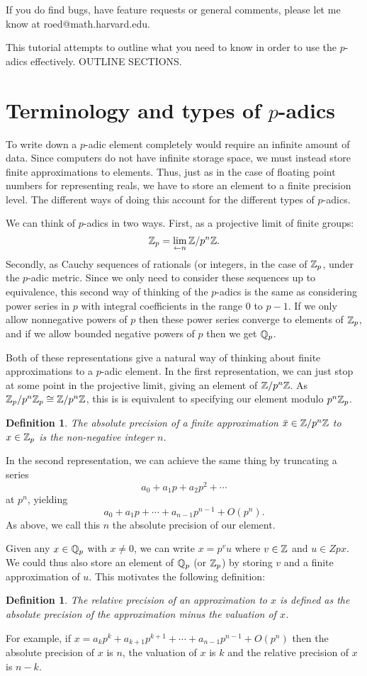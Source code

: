 \documentclass[12pt]{article}
\newtheorem{definition}[theorem]{Definition}
\begin{document}
If you do find bugs, have feature requests or general comments, please let me know
at roed@math.harvard.edu.

This tutorial attempts to outline what you need to know in order to use
the $p$-adics effectively.  OUTLINE SECTIONS.

\section{Terminology and types of $p$-adics}

To write down a $p$-adic element completely would require an infinite amount of data.
Since computers do not have infinite storage space, we must instead store finite
approximations to elements.  Thus, just as in the case of floating point numbers for
representing reals, we have to store an element to a finite precision level.
The different ways of doing this account for the different types of $p$-adics.

We can think of $p$-adics in two ways.  First, as a projective limit of finite groups:
$$\mathbb{Z}_p = \lim_{\leftarrow n} \mathbb{Z} / p^n\mathbb{Z}.$$
Secondly, as Cauchy sequences of rationals (or integers, in the case of $\mathbb{Z}_p$, under the
$p$-adic metric.  Since we only need to consider these sequences up to equivalence, this
second way of thinking of the $p$-adics is the same as considering power series in $p$ with
integral coefficients in the range $0$ to $p-1$.  If we only allow nonnegative powers of $p$
then these power series converge to elements of $\mathbb{Z}_p$, and if we allow bounded negative powers
of $p$ then we get $\mathbb{Q}_p$.

Both of these representations give a natural way of thinking about finite approximations to a
$p$-adic element.  In the first representation, we can just stop at some point
in the projective limit, giving an element of $\mathbb{Z} / p^n\mathbb{Z}$.  As $\mathbb{Z}_p / p^n\mathbb{Z}_p \cong \mathbb{Z} / p^n\mathbb{Z}$,
this is is equivalent to specifying our element modulo $p^n\mathbb{Z}_p$.
\begin{definition}
The \emph{absolute precision} of a finite approximation $\bar{x} \in \mathbb{Z} / p^n\mathbb{Z}$ to $x \in \mathbb{Z}_p$
is the non-negative integer $n$.
\end{definition}
In the second representation, we can achieve the same thing by truncating a series
$$a_0 + a_1 p + a_2 p^2 + \cdots$$
at $p^n$, yielding
$$a_0 + a_1 p + \cdots + a_{n-1} p^{n-1} + O(p^n).$$
As above, we call this $n$ the absolute precision of our element.

Given any $x \in \mathbb{Q}_p$ with $x \ne 0$, we can write $x = p^v u$ where $v \in \mathbb{Z}$ and $u \in Zpx$.
We could thus also store an element of $\mathbb{Q}_p$ (or $\mathbb{Z}_p$) by storing $v$ and a finite approximation
of $u$.  This motivates the following definition:
\begin{definition}
The \emph{relative precision} of an approximation to $x$ is defined as the absolute precision
of the approximation minus the valuation of $x$.
\end{definition}
For example, if $x = a_k p^k + a_{k+1} p^{k+1} + \cdots + a_{n-1} p^{n-1} + O(p^n)$  then the
absolute precision of $x$ is $n$, the valuation of $x$ is $k$ and the relative precision of $x$
is $n-k$.
\end{document}
